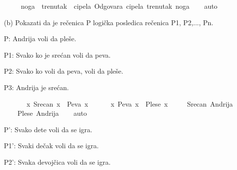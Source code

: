 \begin{isabellebody}
\begin{exercise}[subtitle=Zapisivanje logičkih formula (nastavak)]
\ \ \ \ {\isacharparenleft}{\kern0pt}{\isasymforall}\ noga{\isachardot}{\kern0pt}\ {\isasymexists}\ trenutak{\isachardot}{\kern0pt}\ {\isasymexists}\ cipela{\isachardot}{\kern0pt}\ Odgovara\ cipela\ trenutak\ noga{\isacharparenright}{\kern0pt}{\isachardoublequoteclose}\isanewline
%
\isadelimproof
\ \ %
\endisadelimproof
%
\isatagproof
{}\isamarkupfalse%
\ auto%
\endisatagproof
{\isafoldproof}%
%
\isadelimproof
%
\endisadelimproof
%
\begin{isamarkuptext}%
(b) Pokazati da je rečenica P logička posledica rečenica P1, P2,..., Pn.%
\end{isamarkuptext}\isamarkuptrue%
%
\begin{isamarkuptext}%
P:  Andrija voli da pleše.%
\end{isamarkuptext}\isamarkuptrue%
%
\begin{isamarkuptext}%
P1: Svako ko je srećan voli da peva.%
\end{isamarkuptext}\isamarkuptrue%
%
\begin{isamarkuptext}%
P2: Svako ko voli da peva, voli da pleše.%
\end{isamarkuptext}\isamarkuptrue%
%
\begin{isamarkuptext}%
P3: Andrija je srećan.%
\end{isamarkuptext}\isamarkuptrue%
\isamarkupfalse%
\ {\isachardoublequoteopen}\isanewline
\ \ \ \ {\isacharparenleft}{\kern0pt}{\isasymforall}\ x{\isachardot}{\kern0pt}\ Srecan\ x\ {\isasymlongrightarrow}\ Peva\ x{\isacharparenright}{\kern0pt}\ {\isasymand}\isanewline
\ \ \ \ {\isacharparenleft}{\kern0pt}{\isasymforall}\ x{\isachardot}{\kern0pt}\ Peva\ x\ {\isasymlongrightarrow}\ Plese\ x{\isacharparenright}{\kern0pt}\ {\isasymand}\isanewline
\ \ \ \ Srecan\ Andrija\ {\isasymlongrightarrow}\isanewline
\ \ \ \ Plese\ Andrija{\isachardoublequoteclose}\isanewline
%
\isadelimproof
\ \ %
\endisadelimproof
%
\isatagproof
{}\isamarkupfalse%
\ auto%
\endisatagproof
{\isafoldproof}%
%
\isadelimproof
%
\endisadelimproof
%
\begin{isamarkuptext}%
P':  Svako dete voli da se igra.%
\end{isamarkuptext}\isamarkuptrue%
%
\begin{isamarkuptext}%
P1': Svaki dečak voli da se igra.%
\end{isamarkuptext}\isamarkuptrue%
%
\begin{isamarkuptext}%
P2': Svaka devojčica voli da se igra.%
\end{isamarkuptext}\isamarkuptrue%
%

\end{exercise}
\end{isabellebody}
